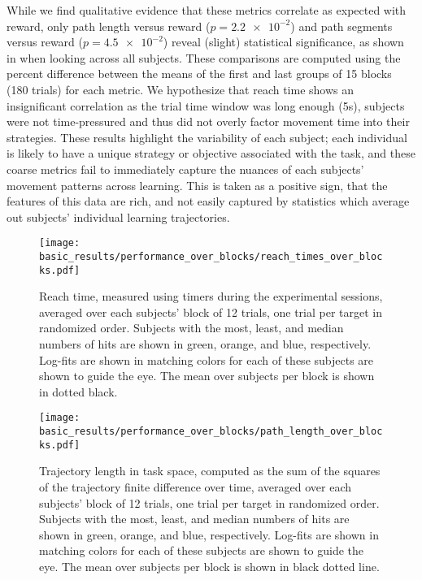 \documentclass[../main.tex]{subfiles}
\begin{document}
While we find qualitative evidence that these metrics correlate as expected with reward, only path length versus reward ($p=\num{2.2e-2}$) and path segments versus reward ($p=\num{4.5e-2}$) reveal (slight) statistical significance, as shown in  when looking across all subjects. These comparisons are computed using the percent difference between the means of the first and last groups of 15 blocks (180 trials) for each metric. We hypothesize that reach time shows an insignificant correlation as the trial time window was long enough (5s), subjects were not time-pressured and thus did not overly factor movement time into their strategies. These results highlight the variability of each subject; each individual is likely to have a unique strategy or objective associated with the task, and these coarse metrics fail to immediately capture the nuances of each subjects' movement patterns across learning. This is taken as a positive sign, that the features of this data are rich, and not easily captured by statistics which average out subjects' individual learning trajectories.

\begin{figure}[!htb]%
    \centering
    \texttt{[image: basic\_results/performance\_over\_blocks/reach\_times\_over\_blocks.pdf]}
    \caption[Reach time over blocks]{Reach time, measured using timers during the experimental sessions, averaged over each subjects' block of 12 trials, one trial per target in randomized order. Subjects with the most, least, and median numbers of hits are shown in green, orange, and blue, respectively. Log-fits are shown in matching colors for each of these subjects are shown to guide the eye. The mean over subjects per block is shown in dotted black.}\label{fig:reach_times_over_blocks}
\end{figure}

\begin{figure}[!htb]%
    \centering
    \texttt{[image: basic\_results/performance\_over\_blocks/path\_length\_over\_blocks.pdf]}
    \caption[Trajectory length over blocks]{Trajectory length in task space, computed as the sum of the squares of the trajectory finite difference over time, averaged over each subjects' block of 12 trials, one trial per target in randomized order. Subjects with the most, least, and median numbers of hits are shown in green, orange, and blue, respectively. Log-fits are shown in matching colors for each of these subjects are shown to guide the eye. The mean over subjects per block is shown in black dotted line.}\label{fig:path_length_over_blocks}
\end{figure}
\end{document}
